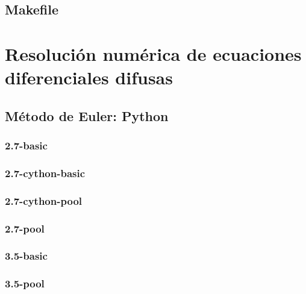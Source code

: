 \newpage
\subsection{Makefile}


\section{Resolución numérica de ecuaciones diferenciales difusas}
\subsection{Método de Euler: Python}
\label{prueba:euler_python}
\subsubsection{2.7-basic}

\newpage

\subsubsection{2.7-cython-basic}

\newpage

\subsubsection{2.7-cython-pool}

\newpage

\subsubsection{2.7-pool}

\newpage

\subsubsection{3.5-basic}

\newpage

\subsubsection{3.5-pool}

\newpage

